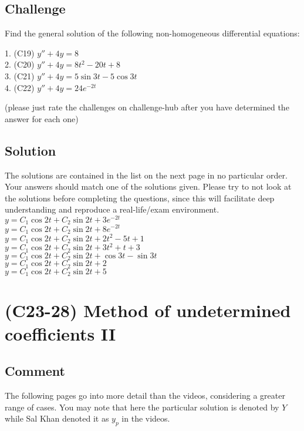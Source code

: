 \subsection*{Challenge}
Find the general solution of the following non-homogeneous differential equations:

1. (C19) $y'' + 4y = 8$\\
2. (C20) $y'' + 4y = 8t^2 - 20t + 8$\\
3. (C21) $y'' + 4y = 5 \sin 3t - 5 \cos 3t$\\
4. (C22) $y'' + 4y = 24 e^{-2t}$

(please just rate the challenges on challenge-hub after you have determined the answer for each one)

\subsection*{Solution}
The solutions are contained in the list on the next page in no particular order. Your answers should match one of the solutions given. Please try to not look at the solutions before completing the questions, since this will facilitate deep understanding and reproduce a real-life/exam environment.
\newpage
$y = C_1 \cos 2t + C_2 \sin 2t + 3e^{-2t}$\\ %
$y = C_1 \cos 2t + C_2 \sin 2t + 8e^{-2t}$\\
$y = C_1 \cos 2t + C_2 \sin 2t + 2t^2 - 5t + 1$\\ %
$y = C_1 \cos 2t + C_2 \sin 2t + 3t^2 + t + 3$\\
$y = C_1 \cos 2t + C_2 \sin 2t + \cos 3t - \sin 3t$\\ %
$y = C_1 \cos 2t + C_2 \sin 2t + 2$\\ %
$y = C_1 \cos 2t + C_2 \sin 2t + 5$\\



\newpage
\section{(C23-28) Method of undetermined coefficients II}

\subsection*{Comment}
The following pages go into more detail than the videos, considering a greater range of cases. You may note that here the particular solution is denoted by $Y$ while Sal Khan denoted it as $y_p$ in the videos.


